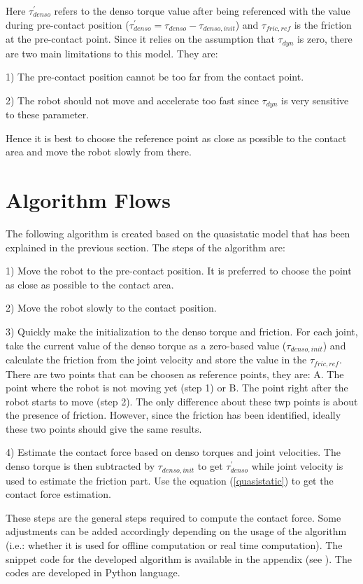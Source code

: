Here $\tau_{denso}^{\prime}$ refers to the denso torque value after being referenced with the value during pre-contact position ($\tau_{denso}^{\prime} = \tau_{denso} - \tau_{denso , init}$) and $\tau_{fric , ref}$ is the friction at the pre-contact point. Since it relies on the assumption that $\tau_{dyn}$ is zero, there are two main limitations to this model. They are:

1) The pre-contact position cannot be too far from the contact point. 

2) The robot should not move and accelerate too fast since $\tau_{dyn}$ is very sensitive to these parameter.

Hence it is best to choose the reference point as close as possible to the contact area and move the robot slowly from there.

\section{Algorithm Flows}
\label{algorithm}

The following algorithm is created based on the quasistatic model that has been explained in the previous section. The steps of the algorithm are:

1) Move the robot to the pre-contact position. It is preferred to choose the point as close as possible to the contact area.

2) Move the robot slowly to the contact position.

3) Quickly make the initialization to the denso torque and friction. For each joint, take the current value of the denso torque as a zero-based value ($\tau_{denso , init} $) and calculate the friction from the joint velocity and store the value in the $\tau_{fric , ref}$. There are two points that can be choosen as reference points, they are: A. The point where the robot is not moving yet (step 1) or B. The point right after the robot starts to move (step 2). The only difference about these twp points is about the presence of friction. However, since the friction has been identified, ideally these two points should give the same results.

4) Estimate the contact force based on denso torques and joint velocities. The denso torque is then subtracted by $\tau_{denso , init}$ to get $\tau_{denso}^{\prime}$ while joint velocity is used to estimate the friction part. Use the equation (\ref{quasistatic}) to get the contact force estimation.

These steps are the general steps required to compute the contact force. Some adjustments can be added accordingly depending on the usage of the algorithm (i.e.: whether it is used for offline computation or real time computation). The snippet code for the developed algorithm is available in the appendix (see ). The codes are developed in Python language.

